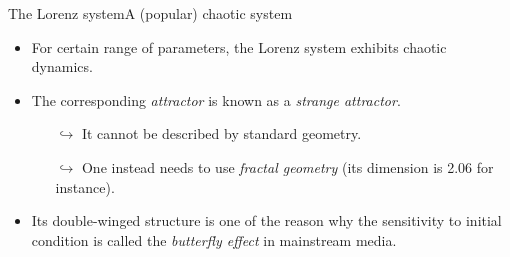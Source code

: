 \documentclass[usenames,dvipsnames,svgnames,10pt,aspectratio=169]{beamer}
\begin{document}
\begin{frame}[t, c]{The Lorenz system}{A (popular) chaotic system}
	\begin{minipage}{.38\textwidth}
		\centering
	\end{minipage}%
	\hfill
	\begin{minipage}{.58\textwidth}
		\begin{itemize}
			\item For certain range of parameters, the Lorenz system exhibits chaotic dynamics.

			\medskip

			\item The corresponding \emph{attractor} is known as a \emph{strange attractor}.
			\begin{itemize}
				\item[\( \hookrightarrow \)] It cannot be described by standard geometry.
				\item[\( \hookrightarrow \)] One instead needs to use \emph{fractal geometry} (its dimension is 2.06 for instance).
			\end{itemize}

			\medskip

			\item Its double-winged structure is one of the reason why the sensitivity to initial condition is called the \emph{butterfly effect} in mainstream media.
		\end{itemize}
	\end{minipage}

	\vspace{1cm}
\end{frame}
\end{document}
